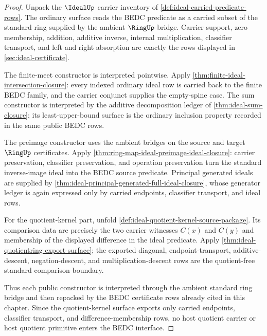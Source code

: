 \begin{proof}
Unpack the $\IdealUp$ carrier inventory of \autoref{def:ideal-carried-predicate-rows}. The ordinary surface reads the BEDC predicate as a carried subset of the standard ring supplied by the ambient $\RingUp$ bridge. Carrier support, zero membership, addition, additive inverse, internal multiplication, classifier transport, and left and right absorption are exactly the rows displayed in \autoref{sec:ideal-certificate}.

The finite-meet constructor is interpreted pointwise. Apply \autoref{thm:finite-ideal-intersection-closure}: every indexed ordinary ideal row is carried back to the finite BEDC family, and the carrier conjunct supplies the empty-spine case. The sum constructor is interpreted by the additive decomposition ledger of \autoref{thm:ideal-sum-closure}; its least-upper-bound surface is the ordinary inclusion property recorded in the same public BEDC rows.

The preimage constructor uses the ambient bridges on the source and target $\RingUp$ certificates. Apply \autoref{thm:ring-map-ideal-preimage-ideal-closure}: carrier preservation, classifier preservation, and operation preservation turn the standard inverse-image ideal into the BEDC source predicate. Principal generated ideals are supplied by \autoref{thm:ideal-principal-generated-full-ideal-closure}, whose generator ledger is again expressed only by carried endpoints, classifier transport, and ideal rows.

For the quotient-kernel part, unfold \autoref{def:ideal-quotient-kernel-source-package}. Its comparison data are precisely the two carrier witnesses $C(x)$ and $C(y)$ and membership of the displayed difference in the ideal predicate. Apply \autoref{thm:ideal-quotientring-export-surface}; the exported diagonal, endpoint-transport, additive-descent, negation-descent, and multiplication-descent rows are the quotient-free standard comparison boundary.

Thus each public constructor is interpreted through the ambient standard ring bridge and then repacked by the BEDC certificate rows already cited in this chapter. Since the quotient-kernel surface exports only carried endpoints, classifier transport, and difference-membership rows, no host quotient carrier or host quotient primitive enters the BEDC interface.
\end{proof}

